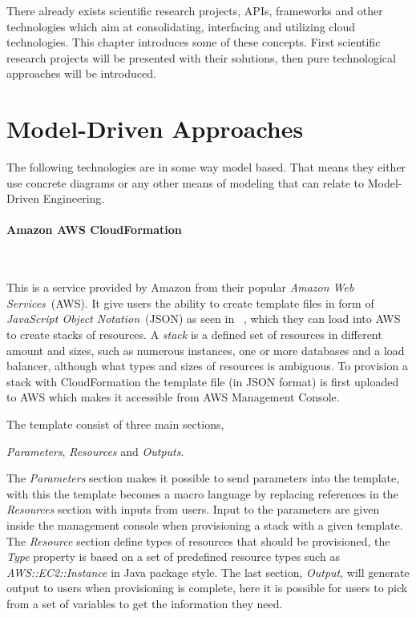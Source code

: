 
There already exists scientific research projects, APIs, frameworks 
and other technologies which aim at consolidating, interfacing and utilizing cloud technologies.
This chapter introduces some of these concepts.
First scientific research projects will be presented with their solutions, 
then pure technological approaches will be introduced.

\section{Model-Driven Approaches}

The following technologies are in some way model based.
That means they either use concrete diagrams or any other means of
modeling that can relate to Model-Driven Engineering.

\paragraph{Amazon AWS CloudFormation}~\cite{aws}



This is a service provided by Amazon from their popular \emph{Amazon Web Services}~(AWS).
It give users the ability to create template files in form of 
\emph{JavaScript Object Notation}~(JSON) as seen in ~, 
which they can load into AWS to create stacks of resources. 
A \emph{stack} is a defined set of resources in different amount and sizes, such as numerous instances,
one or more databases and a load balancer, although what types and sizes of resources is ambiguous.
To provision a stack with CloudFormation the template file (in JSON format) is first uploaded to
AWS which makes it accessible from AWS Management Console.

The template consist of three main sections, 
\begin{ii}\iitem \emph{Parameters}, \iitem \emph{Resources} and \iitem \emph{Outputs}.\end{ii}
The \emph{Parameters} section makes it possible to send parameters into the template, 
with this the template becomes a macro language by replacing references in the \emph{Resources} section 
with inputs from users. Input to the parameters are given inside the management console when 
provisioning a stack with a given template.
The \emph{Resource} section define types of resources that should be provisioned, the \emph{Type}
property is based on a set of predefined resource types such as \emph{AWS::EC2::Instance}
in Java package style.
The last section, \emph{Output}, will generate output to users when provisioning is complete,
here it is possible for users to pick from a set of variables to get the information they need.

